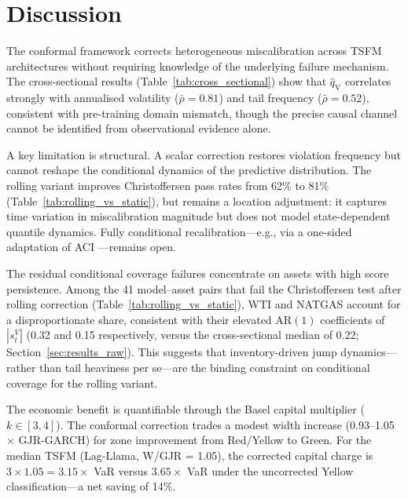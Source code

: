 \documentclass[preprint,11pt,authoryear]{elsarticle}
\newcommand{\1}{\boldsymbol{1}}
\newcommand{\qV}{\hat{q}_{\scriptscriptstyle\mathrm{V}}}
\begin{document}
	\section{Discussion}
	\label{sec:discuss}
	\label{sec:failure}
	
	The conformal framework corrects heterogeneous miscalibration
	across TSFM architectures without requiring knowledge of the
	underlying failure mechanism. The cross-sectional results
	(Table~\ref{tab:cross_sectional}) show that $\qV$ correlates
	strongly with annualised volatility ($\bar\rho = 0.81$) and
	tail frequency ($\bar\rho = 0.52$), consistent with
	pre-training domain mismatch, though the precise causal
	channel cannot be identified from observational evidence alone.
	
	A key limitation is structural. A scalar correction restores
	violation frequency but cannot reshape the conditional
	dynamics of the predictive distribution. The rolling variant
	improves Christoffersen pass rates from 62\% to 81\%
	(Table~\ref{tab:rolling_vs_static}), but remains a location
	adjustment: it captures time variation in miscalibration magnitude but does not model state-dependent quantile dynamics. Fully conditional recalibration---e.g., via a
	one-sided adaptation of ACI \citep{gibbs2021adaptive}---remains
	open.

	The residual conditional coverage failures concentrate on assets
	with high score persistence. Among the 41 model--asset pairs that
	fail the Christoffersen test after rolling correction
	(Table~\ref{tab:rolling_vs_static}), WTI and NATGAS account for
	a disproportionate share, consistent with their elevated
	$\mathrm{AR}(1)$ coefficients of $|s^V_t|$ (0.32 and 0.15
	respectively, versus the cross-sectional median of 0.22;
	Section~\ref{sec:results_raw}). This suggests that
	inventory-driven jump dynamics---rather than tail heaviness per
	se---are the binding constraint on conditional coverage for the
	rolling variant.

	The economic benefit is quantifiable through the Basel capital
	multiplier ($k \in [3,4]$). The conformal correction trades a
	modest width increase (0.93--1.05$\times$ GJR-GARCH) for zone
	improvement from Red/Yellow to Green. For the median TSFM
	(Lag-Llama, W/GJR = 1.05), the corrected capital charge is
	$3 \times 1.05 = 3.15\times$ VaR versus $3.65\times$ VaR
	under the uncorrected Yellow classification---a net saving
	of 14\%.
\end{document}
